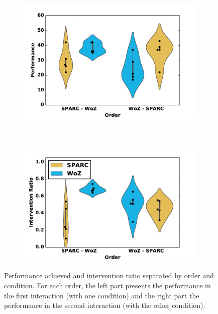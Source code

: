 \begin{figure}[ht]
	\centering
	\begin{subfigure}[t]{0.5\textwidth}
		\centering
		\includegraphics[width=1.\textwidth]{./images/woz_perf_divided.pdf}
	\end{subfigure}%
	~ 
	\begin{subfigure}[t]{0.5\textwidth}
		\centering
		\includegraphics[width=1.\textwidth]{./images/woz_ratio_divided.pdf}
	\end{subfigure}
	\caption{Performance achieved and intervention ratio separated by order and condition. For each order, the left part presents the performance in the first interaction (with one condition) and the right part the performance in the second interaction (with the other condition).}
	\label{fig:woz_separated}
\end{figure}


